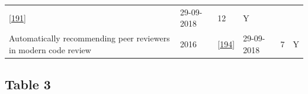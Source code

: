 \documentclass[]{book}
\begin{document}
\begin{longtable}[]{@{}llllll@{}}
\begin{minipage}[t]{0.13\columnwidth}
{[}\protect\hyperlink{ref-yang2016mining}{191}{]}\strut
\end{minipage} & \begin{minipage}[t]{0.06\columnwidth}\raggedright\strut
29-09-2018\strut
\end{minipage} & \begin{minipage}[t]{0.07\columnwidth}\raggedright\strut
12\strut
\end{minipage} & \begin{minipage}[t]{0.08\columnwidth}\raggedright\strut
Y\strut
\end{minipage}\tabularnewline
\begin{minipage}[t]{0.47\columnwidth}\raggedright\strut
Automatically recommending peer reviewers in modern code review\strut
\end{minipage} & \begin{minipage}[t]{0.03\columnwidth}\raggedright\strut
2016\strut
\end{minipage} & \begin{minipage}[t]{0.13\columnwidth}\raggedright\strut
{[}\protect\hyperlink{ref-zanjani2016automatically}{194}{]}\strut
\end{minipage} & \begin{minipage}[t]{0.06\columnwidth}\raggedright\strut
29-09-2018\strut
\end{minipage} & \begin{minipage}[t]{0.07\columnwidth}\raggedright\strut
7\strut
\end{minipage} & \begin{minipage}[t]{0.08\columnwidth}\raggedright\strut
Y\strut
\end{minipage}\tabularnewline
\bottomrule
\end{longtable}

\subsection{Table 3}\label{table-3}
\end{document}
